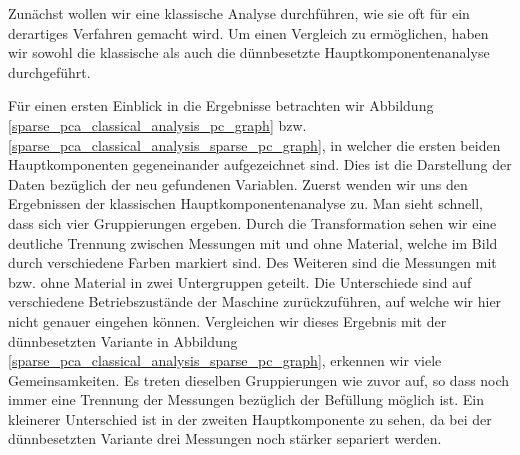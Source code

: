 Zunächst wollen wir eine klassische Analyse durchführen, wie sie oft für ein derartiges Verfahren gemacht wird. Um einen Vergleich zu ermöglichen, haben wir sowohl die klassische als auch die dünnbesetzte Hauptkomponentenanalyse durchgeführt. 

Für einen ersten Einblick in die Ergebnisse betrachten wir Abbildung \ref{sparse_pca_classical_analysis_pc_graph} bzw. \ref{sparse_pca_classical_analysis_sparse_pc_graph}, in welcher die ersten beiden Hauptkomponenten gegeneinander aufgezeichnet sind. Dies ist die Darstellung der Daten bezüglich der neu gefundenen Variablen. Zuerst wenden wir uns den Ergebnissen der klassischen Hauptkomponentenanalyse zu. Man sieht schnell, dass sich vier Gruppierungen ergeben. Durch die Transformation sehen wir eine deutliche Trennung zwischen Messungen mit und ohne Material, welche im Bild durch verschiedene Farben markiert sind. Des Weiteren sind die Messungen mit bzw. ohne Material in zwei Untergruppen geteilt. Die Unterschiede sind auf verschiedene Betriebszustände der Maschine zurückzuführen, auf welche wir hier nicht genauer eingehen können. Vergleichen wir dieses Ergebnis mit der dünnbesetzten Variante in Abbildung \ref{sparse_pca_classical_analysis_sparse_pc_graph}, erkennen wir viele Gemeinsamkeiten. Es treten dieselben Gruppierungen wie zuvor auf, so dass noch immer eine Trennung der Messungen bezüglich der Befüllung möglich ist. Ein kleinerer Unterschied ist in der zweiten Hauptkomponente zu sehen, da bei der dünnbesetzten Variante drei Messungen noch stärker separiert werden.

